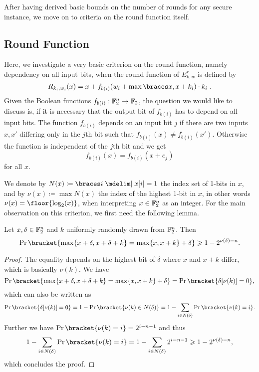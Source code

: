 After having derived basic bounds on the number of rounds for any secure instance, we move on to criteria on the round function itself.

\subsection{Round Function}
Here, we investigate a very basic criterion on the round function, namely dependency on all input bits, when the round function of $E^r_{k,w}$ is defined by
\begin{equation*}
    R_{k_i,w_i}(x) = x + f_{b(i)}(w_i + \max\set{x, x + k_i}) \cdot k_i\;.
\end{equation*}
Given the Boolean functions $f_{b(i)}:\mathbb{F}_2^n \to \mathbb{F}_2$, the question we would like to discuss is, if it is necessary that the output bit of $f_{b(i)}$ has to depend on all input bits.
The function $f_{b(i)}$ depends on an input bit $j$ if there are two inputs $x,x'$ differing only in the $j$th bit such that $f_{b(i)}(x)\ne f_{b(i)}(x')$.
Otherwise the function is independent of the $j$th bit and we get
\begin{equation*}
    f_{b(i)}(x) = f_{b(i)}(x+e_j)
\end{equation*}
for all $x$.

We denote by $N(x) \coloneqq \set{i \given x[i] = 1}$ the index set of 1-bits in $x$, and by $\nu(x) \coloneqq \max N(x)$ the index of the highest 1-bit in $x$, in other words $\nu(x) = \floor{\log_2(x)}$, when interpreting $x \in \mathbb{F}_2^n$ as an integer.
For the main observation on this criterion, we first need the following lemma.
\begin{lemma}
\label{bison:lem:max_diff}
    Let $x, \delta \in \mathbb{F}_2^n$ and $k$ uniformly randomly drawn from $\mathbb{F}_2^n$.
    Then
    \begin{equation*}
        \Pr\bracket{\max\{x+\delta,x+\delta+k\}=\max\{x,x+k\}+\delta} \geqslant 1-2^{\nu(\delta)-n}.
    \end{equation*}
\end{lemma}
\begin{proof}
    The equality depends on the highest bit of $\delta$ where $x$ and $x + k$ differ, which is basically $\nu(k)$.
    We have
    \begin{equation*}
        \Pr\bracket{\max\{x+\delta,x+\delta+k\}=\max\{x,x+k\}+\delta} = \Pr\bracket{\delta[\nu(k)] = 0},
    \end{equation*}
    which can also be written as
    \begin{equation*}
        \Pr\bracket{\delta[\nu(k)] = 0}
        = 1 - \Pr\bracket{\nu(k) \in N(\delta)}
        = 1 - \sum_{i \in N(\delta)} \Pr\bracket{\nu(k) = i}.
    \end{equation*}
    Further we have $\Pr\bracket{\nu(k) = i} = 2^{i-n-1}$ and thus
    \begin{equation*}
        1 - \sum_{i \in N(\delta)} \Pr\bracket{\nu(k) = i} = 1 - \sum_{i \in N(\delta)} 2^{i - n - 1} \geqslant 1 - 2^{\nu(\delta) - n},
    \end{equation*}
    which concludes the proof.
\end{proof}

